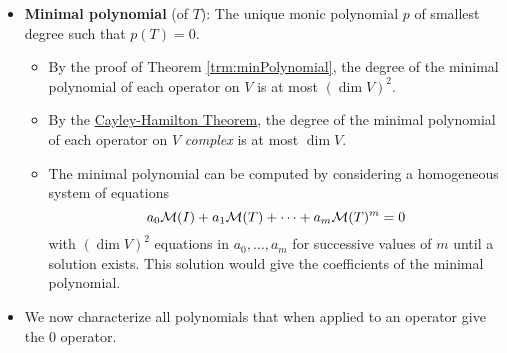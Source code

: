 \documentclass[../main.tex]{subfiles}
\begin{document}
\begin{itemize}
\begin{theorem}
\begin{proof}
            \begin{equation*}
                a_0I+a_1T+a_2T^2+\cdots+a_{m-1}T^{m-1}+T^m = 0
            \end{equation*}
            Therefore, if we consider the monic polynomial $p\in\pol{\F}$ defined by
            \begin{equation*}
                p(z) = a_0+a_1z+a_2z^2+\cdots+a_{m-1}z^{m-1}+z^m
            \end{equation*}
            we know by the above that $p(T)=0$.\par
            Suppose for the sake of contradiction that there exists a monic polynomial $q\in\pol{\F}$ of degree less than or equal to $m$ such that $q(T)=0$. If $\deg q<m$, then $I,T,T^2,\dots,T^{\deg q}$ will be linearly independent, so $q(z)=0$. But this implies the highest degree coefficient of $q$ is not 1, so $q$ is not monic, a contradiction. On the other hand, if $\deg q=m$, then we have that $(p-q)(T)=0$ as well. However, since both $p$ and $z$ have a $1z^m$ term that cancels in $p-q$, $\deg(p-q)<m$. Thus, we can reach the same contradiction in the other case.
        \end{proof}
    \end{theorem}
    \item \textbf{Minimal polynomial} (of $T$): The unique monic polynomial $p$ of smallest degree such that $p(T)=0$.
    \begin{itemize}
        \item By the proof of Theorem \ref{trm:minPolynomial}, the degree of the minimal polynomial of each operator on $V$ is at most $(\dim V)^2$.
        \item By the \hyperref[trm:CayleyHamilton]{Cayley-Hamilton Theorem}, the degree of the minimal polynomial of each operator on $V$ \emph{complex} is at most $\dim V$.
        \item The minimal polynomial can be computed by considering a homogeneous system of equations
        \begin{equation*}
            a_0\mathcal{M}(I)+a_1\mathcal{M}(T)+\cdots+a_m\mathcal{M}(T)^m = 0
        \end{equation*}
        with $(\dim V)^2$ equations in $a_0,\dots,a_m$ for successive values of $m$ until a solution exists. This solution would give the coefficients of the minimal polynomial.
    \end{itemize}
    \item We now characterize all polynomials that when applied to an operator give the 0 operator.

\end{itemize}
\end{document}
